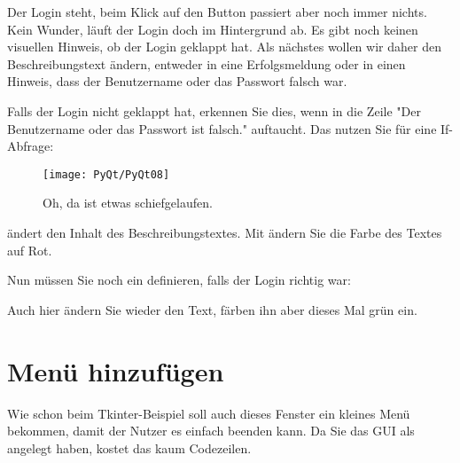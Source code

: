 Der Login steht, beim Klick auf den Button passiert aber noch immer nichts. Kein Wunder, läuft der Login doch im Hintergrund ab. Es gibt noch keinen visuellen Hinweis, ob der Login geklappt hat. Als nächstes wollen wir daher den Beschreibungstext ändern, entweder in eine Erfolgsmeldung oder in einen Hinweis, dass der Benutzername oder das Passwort falsch war.
    
Falls der Login nicht geklappt hat, erkennen Sie dies, wenn in  die Zeile "Der Benutzername oder das Passwort ist falsch." auftaucht. Das nutzen Sie für eine If-Abfrage:

\medskip
    



\medskip    

\begin{figure}
  \centering    
  \texttt{[image: PyQt/PyQt08]}    
  \caption{Oh, da ist etwas schiefgelaufen.}\label{PyQt08}
\end{figure}    

 ändert den Inhalt des Beschreibungstextes. Mit  ändern Sie die Farbe des Textes auf Rot.
    
Nun müssen Sie noch ein  definieren, falls der Login richtig war:
    
\medskip
    



\medskip

Auch hier ändern Sie wieder den Text, färben ihn aber dieses Mal grün ein.
    
\section{Menü hinzufügen}

Wie schon beim Tkinter-Beispiel soll auch dieses Fenster ein kleines Menü bekommen, damit der Nutzer es einfach beenden kann. Da Sie das GUI als  angelegt haben, kostet das kaum Codezeilen.
    
